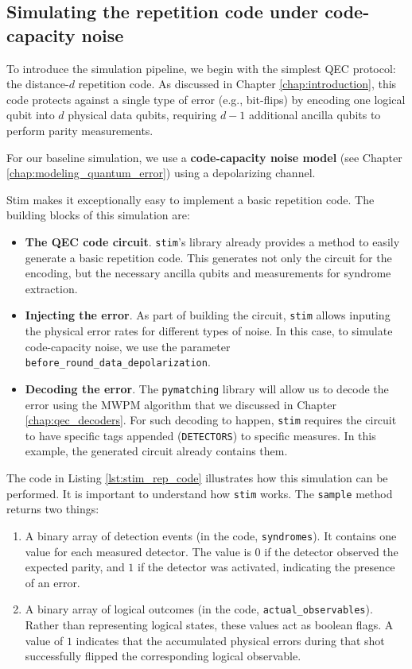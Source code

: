 \subsection{Simulating the repetition code under code-capacity noise}
\label{subsec:repetition_code_sim}

To introduce the simulation pipeline, we begin with the simplest QEC protocol: the distance-$d$ repetition code. As discussed in Chapter \ref{chap:introduction}, this code protects against a single type of error (e.g., bit-flips) by encoding one logical qubit into $d$ physical data qubits, requiring $d-1$ additional ancilla qubits to perform parity measurements.

For our baseline simulation, we use a \textbf{code-capacity noise model} (see Chapter \ref{chap:modeling_quantum_error}) using a depolarizing channel. 

Stim makes it exceptionally easy to implement a basic repetition code. The building blocks of this simulation are:
\begin{itemize}
    \item \textbf{The QEC code circuit}. \texttt{stim}'s library already provides a method to easily generate a basic repetition code. This generates not only the circuit for the encoding, but the necessary ancilla qubits and measurements for syndrome extraction.
    \item \textbf{Injecting the error}. As part of building the circuit, \texttt{stim} allows inputing the physical error rates for different types of noise. In this case, to simulate code-capacity noise, we use the parameter \verb|before_round_data_depolarization|.
    \item \textbf{Decoding the error}. The \texttt{pymatching} library \cite{higgott2022pymatching} will allow us to decode the error using the MWPM algorithm that we discussed in Chapter \ref{chap:qec_decoders}. For such decoding to happen, \texttt{stim} requires the circuit to have specific tags appended (\texttt{DETECTORS}) to specific measures. In this example, the generated circuit already contains them.
\end{itemize}

The code in Listing \ref{lst:stim_rep_code} illustrates how this simulation can be performed. It is important to understand how \texttt{stim} works.  The \texttt{sample} method returns two things:

\begin{enumerate}
    \item A binary array of detection events (in the code, \texttt{syndromes}). It contains one value for each measured detector. The value is $0$ if the detector observed the expected parity, and $1$ if the detector was activated, indicating the presence of an error.
    \item A binary array of logical outcomes (in the code, \texttt{actual\_observables}). Rather than representing logical states, these values act as boolean flags. A value of $1$ indicates that the accumulated physical errors during that shot successfully flipped the corresponding logical observable.
\end{enumerate}

